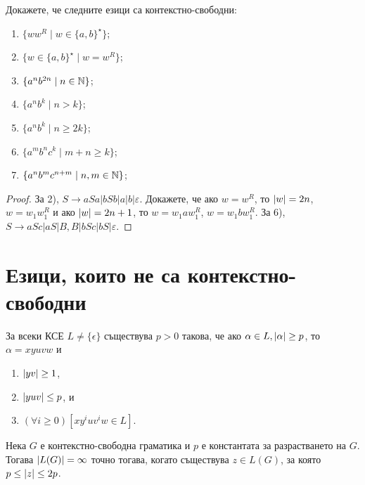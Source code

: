 \begin{problem}
  Докажете, че следните езици са контекстно-свободни:
  \begin{enumerate}[1)]
  \item
    $\{ww^R \mid w \in \{a,b\}^\star\}$;
  \item
    $\{w \in \{a,b\}^\star \mid w = w^R\}$;
  \item
    $\{a^nb^{2n} \mid n \in \mathbb{N}\}$;
  \item
    $\{a^nb^k \mid n > k\}$;
  \item
    $\{a^nb^k \mid n \geq 2k\}$;
  \item
    $\{a^mb^nc^k\mid m+n \geq k\}$;
  \item
    $\{a^nb^mc^{n+m}\mid n,m \in \mathbb{N}\}$;
  \end{enumerate}
\end{problem}
\begin{proof}
  За 2), $S \rightarrow aSa \vert bSb \vert a\vert b \vert \varepsilon$.
  Докажете, че ако $w = w^R$, то $\vert{w}\vert = 2n$, $w = w_1w^R_1$ и ако $\vert{w}\vert = 2n+1$, то $w = w_1aw^R_1$, $w = w_1bw^R_1$.
  За 6), $S \rightarrow aSc\vert aS \vert B, B\vert bSc\vert bS\vert\varepsilon$.
\end{proof}


\section{Езици, които не са контекстно-свободни}

\begin{lemma}
  \label{lem:pumping-context} 
  За всеки КСЕ $L\neq\{\epsilon\}$ съществува $p>0$ такова,
  че ако $\alpha\in L, \vert{\alpha}\vert \geq p$, то $\alpha=xyuvw$ и
  \begin{enumerate}
  \item
    $\vert{yv}\vert\geq 1$,
  \item
    $\vert{yuv}\vert\leq p$, и
  \item
    $(\forall i\geq 0)[xy^iuv^iw\in L]$.
\end{enumerate}
\end{lemma}

\begin{crl}
  Нека $G$ е контекстно-свободна граматика и $p$ е константата за разрастването на $G$.
  Тогава $\vert{L(G)}\vert = \infty$ точно тогава, когато съществува $z \in L(G)$, за която $p \leq \vert{z}\vert \leq 2p$.
\end{crl}

